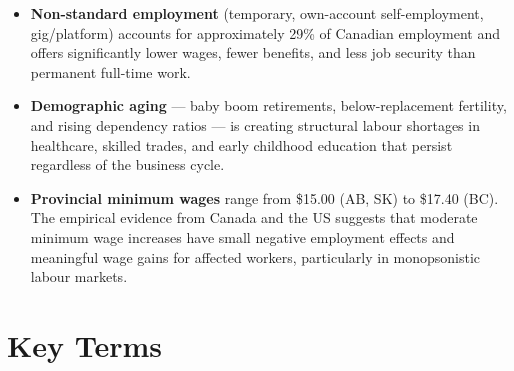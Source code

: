 \begin{itemize}
  \item \textbf{Non-standard employment} (temporary, own-account
        self-employment, gig/platform) accounts for approximately 29\%
        of Canadian employment and offers significantly lower wages, fewer
        benefits, and less job security than permanent full-time work.

  \item \textbf{Demographic aging} --- baby boom retirements, below-replacement
        fertility, and rising dependency ratios --- is creating structural
        labour shortages in healthcare, skilled trades, and early childhood
        education that persist regardless of the business cycle.

  \item \textbf{Provincial minimum wages} range from \$15.00 (AB, SK) to
        \$17.40 (BC). The empirical evidence from Canada and the US suggests
        that moderate minimum wage increases have small negative employment
        effects and meaningful wage gains for affected workers, particularly
        in monopsonistic labour markets.
\end{itemize}

\section*{Key Terms}

